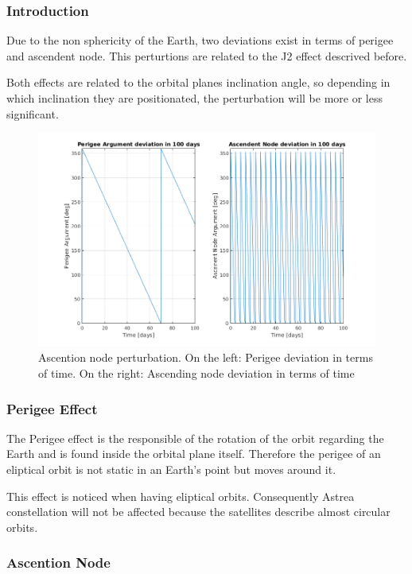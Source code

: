 \subsubsection{Introduction}
Due to the non sphericity of the Earth, two deviations exist in terms of perigee and ascendent node. This perturtions are related to the J2 effect descrived before.

Both effects are related to the orbital planes inclination angle, so depending in which inclination they are positionated, the perturbation will be more or less  significant.

\begin{figure}[H] %
\centering
\includegraphics[width=.8\textwidth]{./decay/Inclination.png}
\caption{Ascention node perturbation. On the left: Perigee deviation in terms of time. On the right: Ascending node deviation in terms of time}
\label{fig:Inclination} 
\end{figure}

\subsubsection{Perigee Effect}

The Perigee effect is the responsible of the rotation of the orbit regarding the Earth and is found inside the orbital plane itself. Therefore the perigee of an eliptical orbit is not static in an Earth's point but moves around it. 

This effect is noticed when having eliptical orbits. Consequently Astrea constellation will not be affected because the satellites describe almost circular orbits.


\subsubsection{Ascention Node}

